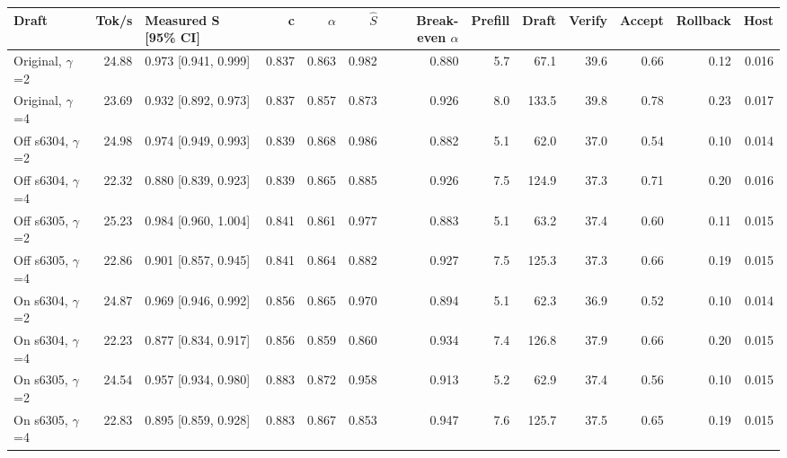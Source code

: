 \scriptsize
\setlength{\tabcolsep}{3.5pt}
\label{tab:t3speedup}
\begin{adjustbox}{max width=\linewidth}
\begin{tabular}{lrlrrrrrrrrrr}
\toprule
Draft & Tok/s & Measured S [95\% CI] & c & $\alpha$ & $\hat S$ & Break-even $\alpha$ & Prefill & Draft & Verify & Accept & Rollback & Host \\
\midrule
Original, $\gamma$=2 & 24.88 & 0.973 [0.941, 0.999] & 0.837 & 0.863 & 0.982 & 0.880 & 5.7 & 67.1 & 39.6 & 0.66 & 0.12 & 0.016 \\
Original, $\gamma$=4 & 23.69 & 0.932 [0.892, 0.973] & 0.837 & 0.857 & 0.873 & 0.926 & 8.0 & 133.5 & 39.8 & 0.78 & 0.23 & 0.017 \\
Off s6304, $\gamma$=2 & 24.98 & 0.974 [0.949, 0.993] & 0.839 & 0.868 & 0.986 & 0.882 & 5.1 & 62.0 & 37.0 & 0.54 & 0.10 & 0.014 \\
Off s6304, $\gamma$=4 & 22.32 & 0.880 [0.839, 0.923] & 0.839 & 0.865 & 0.885 & 0.926 & 7.5 & 124.9 & 37.3 & 0.71 & 0.20 & 0.016 \\
Off s6305, $\gamma$=2 & 25.23 & 0.984 [0.960, 1.004] & 0.841 & 0.861 & 0.977 & 0.883 & 5.1 & 63.2 & 37.4 & 0.60 & 0.11 & 0.015 \\
Off s6305, $\gamma$=4 & 22.86 & 0.901 [0.857, 0.945] & 0.841 & 0.864 & 0.882 & 0.927 & 7.5 & 125.3 & 37.3 & 0.66 & 0.19 & 0.015 \\
On s6304, $\gamma$=2 & 24.87 & 0.969 [0.946, 0.992] & 0.856 & 0.865 & 0.970 & 0.894 & 5.1 & 62.3 & 36.9 & 0.52 & 0.10 & 0.014 \\
On s6304, $\gamma$=4 & 22.23 & 0.877 [0.834, 0.917] & 0.856 & 0.859 & 0.860 & 0.934 & 7.4 & 126.8 & 37.9 & 0.66 & 0.20 & 0.015 \\
On s6305, $\gamma$=2 & 24.54 & 0.957 [0.934, 0.980] & 0.883 & 0.872 & 0.958 & 0.913 & 5.2 & 62.9 & 37.4 & 0.56 & 0.10 & 0.015 \\
On s6305, $\gamma$=4 & 22.83 & 0.895 [0.859, 0.928] & 0.883 & 0.867 & 0.853 & 0.947 & 7.6 & 125.7 & 37.5 & 0.65 & 0.19 & 0.015 \\
\bottomrule
\end{tabular}
\end{adjustbox}
